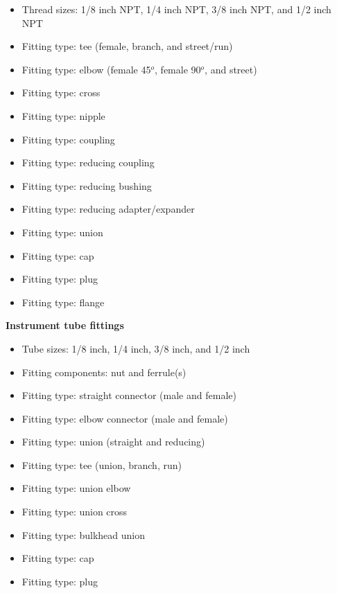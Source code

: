 {{\begin{itemize}
\item{} Thread sizes: 1/8 inch NPT, 1/4 inch NPT, 3/8 inch NPT, and 1/2 inch NPT
\item{} Fitting type: tee (female, branch, and street/run)
\item{} Fitting type: elbow (female 45$^{o}$, female 90$^{o}$, and street)
\item{} Fitting type: cross
\item{} Fitting type: nipple  %
\item{} Fitting type: coupling  %
\item{} Fitting type: reducing coupling  %
\item{} Fitting type: reducing bushing  %
\item{} Fitting type: reducing adapter/expander  %
\item{} Fitting type: union
\item{} Fitting type: cap  %
\item{} Fitting type: plug  %
\item{} Fitting type: flange
\end{itemize}

\vskip 10pt

\noindent
{\bf Instrument tube fittings}

\begin{itemize}
\item{} Tube sizes: 1/8 inch, 1/4 inch, 3/8 inch, and 1/2 inch
\item{} Fitting components: nut and ferrule(s)
\item{} Fitting type: straight connector (male and female)
\item{} Fitting type: elbow connector (male and female)
\item{} Fitting type: union (straight and reducing)
\item{} Fitting type: tee (union, branch, run)
\item{} Fitting type: union elbow
\item{} Fitting type: union cross
\item{} Fitting type: bulkhead union
\item{} Fitting type: cap
\item{} Fitting type: plug
\end{itemize}

}}
